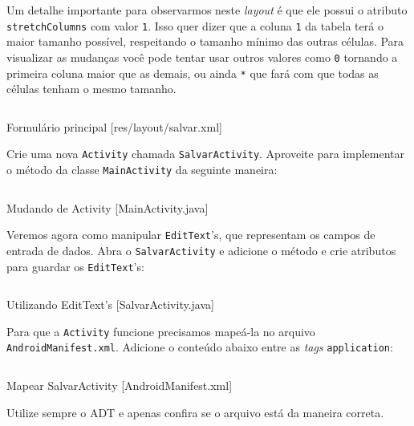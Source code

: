 Um detalhe importante para observarmos neste \textit{layout} é que ele possui o atributo
\texttt{stretchColumns} com valor \texttt{1}. Isso quer dizer que a coluna \texttt{1} da tabela
terá o maior tamanho possível, respeitando o tamanho mínimo das outras células. Para visualizar as mudanças
você pode tentar usar outros valores como \texttt{0} tornando a primeira coluna maior que as demais,
ou ainda \texttt{*} que fará com que todas as células tenham o mesmo tamanho.

\begin{listing}[H]
  \inputminted[linenos=true,frame=bottomline,tabsize=3]{ xml }{ source/salvar-1.xml }
  \caption{Formulário principal [res/layout/salvar.xml]}
\end{listing}

Crie uma nova \texttt{Activity} chamada \texttt{SalvarActivity}. Aproveite para implementar o método
 da classe \texttt{MainActivity} da seguinte maneira:

\begin{listing}[H]
  \inputminted[linenos=true,frame=bottomline,tabsize=3]{ java }{ source/MainActivity-3.java }
  \caption{Mudando de Activity [MainActivity.java]}
\end{listing}

Veremos agora como manipular \texttt{EditText}'s, que representam os campos de entrada de dados. Abra o
\texttt{SalvarActivity} e adicione o método  e crie atributos para guardar os \texttt{EditText}'s:

\begin{listing}[H]
  \inputminted[linenos=true,frame=bottomline,tabsize=3]{ java }{ source/SalvarActivity-1.java }
  \caption{Utilizando EditText's [SalvarActivity.java]}
\end{listing}

Para que a \texttt{Activity} funcione precisamos mapeá-la no arquivo \texttt{AndroidManifest.xml}. Adicione o
conteúdo abaixo entre as \textit{tags} \texttt{application}:

\begin{listing}[H]
  \inputminted[linenos=true,frame=bottomline,tabsize=3]{ xml }{ source/AndroidManifest-2.xml }
  \caption{Mapear SalvarActivity [AndroidManifest.xml]}
\end{listing}

Utilize sempre o ADT e apenas confira se o arquivo está da maneira correta.

